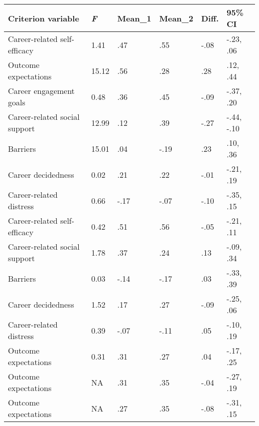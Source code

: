 \begin{table}[ht]
\centering
\begin{tabular}{llllll}
  \hline
Criterion variable & \textit{F} & Mean_1 & Mean_2 & Diff. & 95\% CI \\ 
  \hline
\hspace{3mm} Career-related self-efficacy & 1.41 & .47 & .55 & -.08 & -.23, .06 \\ 
  \hspace{3mm} Outcome expectations & 15.12 & .56 & .28 & .28 & .12, .44 \\ 
  \hspace{3mm} Career engagement goals & 0.48 & .36 & .45 & -.09 & -.37, .20 \\ 
  \hspace{3mm} Career-related social support & 12.99 & .12 & .39 & -.27 & -.44, -.10 \\ 
  \hspace{3mm} Barriers & 15.01 & .04 & -.19 & .23 & .10, .36 \\ 
  \hspace{3mm} Career decidedness & 0.02 & .21 & .22 & -.01 & -.21, .19 \\ 
  \hspace{3mm} Career-related distress & 0.66 & -.17 & -.07 & -.10 & -.35, .15 \\ 
  \hspace{3mm} Career-related self-efficacy & 0.42 & .51 & .56 & -.05 & -.21, .11 \\ 
  \hspace{3mm} Career-related social support & 1.78 & .37 & .24 & .13 & -.09, .34 \\ 
  \hspace{3mm} Barriers & 0.03 & -.14 & -.17 & .03 & -.33, .39 \\ 
  \hspace{3mm} Career decidedness & 1.52 & .17 & .27 & -.09 & -.25, .06 \\ 
  \hspace{3mm} Career-related distress & 0.39 & -.07 & -.11 & .05 & -.10, .19 \\ 
  \hspace{3mm} Outcome expectations & 0.31 & .31 & .27 & .04 & -.17, .25 \\ 
  \hspace{3mm} Outcome expectations & NA & .31 & .35 & -.04 & -.27, .19 \\ 
  \hspace{3mm} Outcome expectations & NA & .27 & .35 & -.08 & -.31, .15 \\ 

\end{tabular}
\end{table}
